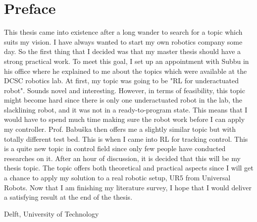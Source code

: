 %
\chapter{Preface}
This thesis came into existence after a long wander to search for a topic which suits my vision. I have always wanted to start my own robotics company some day. So the first thing that I decided was that my master thesis should have a strong practical work. To meet this goal, I set up an appointment with Subbu in his office where he explained to me about the topics which were available at the \ac {DCSC} robotics lab. At first, my topic was going to be "\ac{RL} for underactuated robot". Sounds novel and interesting. However, in terms of feasibility, this topic might become hard since there is only one underactuated robot in the lab, the slacklining robot, and it was not in a ready-to-program state. This means that I would have to spend much time making sure the robot work before I can apply my controller. Prof. Babu\v{s}ka then offers me a slightly similar topic but with totally different test bed. This is when I came into \acs{RL} for tracking control. This is a quite new topic in control field since only few people have conducted researches on it. After an hour of discussion, it is decided that this will be my thesis topic. The topic offers both theoretical and practical aspects since I will get a chance to apply my solution to a real robotic setup, UR5 from Universal Robots. Now that I am finishing my literature survey, I hope that I would deliver a satisfying result at the end of the thesis.

\vspace{30mm}
Delft, University of Technology \hfill \mscname \\
\mscdate